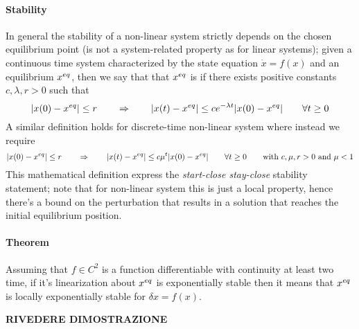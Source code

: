		\paragraph{Stability} In general the stability of a non-linear system strictly depends on the chosen equilibrium point (is not a system-related property as for linear systems); given a continuous time system characterized by the state equation $\dot x = f(x)$ and an equilibrium $x^{eq}$, then we say that that $x^{eq}$ is  if there exists positive constants $c,\lambda,r>0$ such that
		\[ |x(0) - x^{eq}| \leq r \qquad \Rightarrow \qquad |x(t) - x^{eq}| \leq c e^{-\lambda t} |x(0) - x^{eq}| \qquad \forall t\geq 0 \]
		A similar definition holds for discrete-time non-linear system where instead we require
		\[ |x(0) - x^{eq}| \leq r \qquad \Rightarrow \qquad |x(t) - x^{eq}| \leq c \mu^t |x(0) - x^{eq}| \qquad \forall t\geq 0 \qquad \textrm{with } c,\mu,r>0 \textrm{ and } \mu  < 1 \]
		This mathematical definition express the \textit{start-close stay-close} stability statement; note that for non-linear system this is just a local property, hence there's a bound on the perturbation that results in a solution that reaches the initial equilibrium position.
	
		\paragraph{Theorem} Assuming that $f \in C^2$ is a function differentiable with continuity at least two time, if it's linearization about $x^{eq}$ is exponentially stable then it means that $x^{eq}$ is locally exponentially stable for $\delta x = f(x)$.
		
		\textbf{RIVEDERE DIMOSTRAZIONE}
	
	
	
	
	
	
	
	
	
	
	
	
	
	
	
	
	
	
	
	
	
	
	
	
	
	